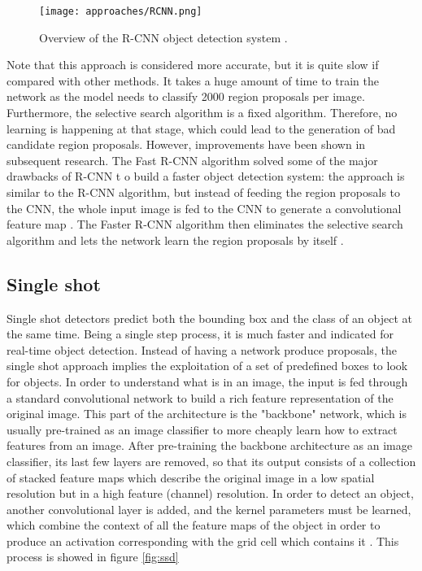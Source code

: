 \begin{figure}[h]
	\caption{Overview of the R-CNN object detection system \cite{Gandhi2018}.}
	\centering
	\texttt{[image: approaches/RCNN.png]}
	\label{fig:rcnn}
\end{figure}

Note that this approach is considered more accurate, but it is quite slow if compared with other methods. It takes a huge amount of time to train the network as the model needs to classify 2000 region proposals per image. Furthermore, the selective search algorithm is a fixed algorithm. Therefore, no learning is happening at that stage, which could lead to the generation of bad candidate region proposals. However, improvements have been shown in subsequent research. The Fast R-CNN algorithm solved some of the major drawbacks of R-CNN t	o build a faster object detection system: the approach is similar to the R-CNN algorithm, but instead of feeding the region proposals to the CNN, the whole input image is fed to the CNN to generate a convolutional feature map \cite{Girshick2015-ay}. The Faster R-CNN algorithm then eliminates the selective search algorithm and lets the network learn the region proposals by itself \cite{Ren2017-fu}.

\subsection{Single shot}
\label{ssec:singleshot}

Single shot detectors predict both the bounding box and the class of an object at the same time. Being a single step process, it is much faster and indicated for real-time object detection. Instead of having a network produce proposals, the single shot approach implies the exploitation of a set of predefined boxes to look for objects. In order to understand what is in an image, the input is fed through a standard convolutional network to build a rich feature representation of the original image. This part of the architecture is the "backbone" network, which is usually pre-trained as an image classifier to more cheaply learn how to extract features from an image. After pre-training the backbone architecture as an image classifier, its last few layers are removed, so that its output consists of a collection of stacked feature maps which describe the original image in a low spatial resolution but in a high feature (channel) resolution. In order to detect an object, another convolutional layer is added, and the kernel parameters must be learned, which combine the context of all the feature maps of the object in order to produce an activation corresponding with the grid cell which contains it \cite{Jordan2018}. This process is showed in figure \ref{fig:ssd} \\

